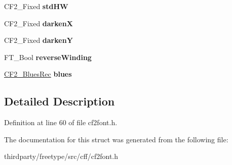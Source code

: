\begin{DoxyCompactItemize}
\mbox{\label{struct_c_f2___font_rec___a5ee4f5920a34ecfa4f03ad184b4aacbe}} 
C\+F2\+\_\+\+Fixed {\bfseries std\+HW}
\item 
\mbox{\label{struct_c_f2___font_rec___ae445d09967cdb13ff6c05c41be125ee7}} 
C\+F2\+\_\+\+Fixed {\bfseries darkenX}
\item 
\mbox{\label{struct_c_f2___font_rec___a6ad9bec76418fbdab2ac1411778dba96}} 
C\+F2\+\_\+\+Fixed {\bfseries darkenY}
\item 
\mbox{\label{struct_c_f2___font_rec___a070ad2cfb7942b73ce49a9ee58fe493b}} 
F\+T\+\_\+\+Bool {\bfseries reverse\+Winding}
\item 
\mbox{\label{struct_c_f2___font_rec___a1db6c1f02f84c47fbbf2967b6c58aeba}} 
\hyperlink{struct_c_f2___blues_rec__}{C\+F2\+\_\+\+Blues\+Rec} {\bfseries blues}
\end{DoxyCompactItemize}


\subsection{Detailed Description}


Definition at line 60 of file cf2font.\+h.



The documentation for this struct was generated from the following file\+:\begin{DoxyCompactItemize}
\item 
thirdparty/freetype/src/cff/cf2font.\+h\end{DoxyCompactItemize}

